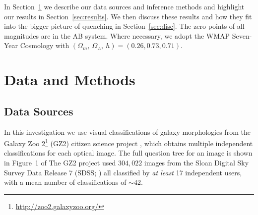 \documentclass[useAMS,usenatbib]{mn2e}
\begin{document}
In Section~\ref{sec:data} we describe our data sources and inference methods and highlight our results in Section~\ref{sec:results}. We then discuss these results and how they fit into the bigger picture of quenching in Section~\ref{sec:disc}. The zero points of all magnitudes are in the AB system. Where necessary, we adopt the WMAP Seven-Year Cosmology \citep{jarosik11} with $(\Omega_m , ~\Omega_\Lambda , ~h) = (0.26, 0.73, 0.71)$.

 
\section{Data and Methods}\label{sec:data}

\subsection{Data Sources}\label{sec:photo}

\begin{figure}
\label{fig:sfrmass}
\end{figure}

In this investigation we use visual classifications of galaxy morphologies from the Galaxy Zoo 2\footnote{\url{http://zoo2.galaxyzoo.org/}} (GZ2) citizen science project \citep{GZ2}, which obtains multiple independent classifications for each optical image. The full question tree for an image is shown in Figure~1 of \citeauthor{GZ2}  The GZ2 project used $304, 022$ images from the Sloan Digital Sky Survey Data Release 7 (SDSS; \citealt{york00, abazajian09}) all classified by \emph{at least} 17 independent users, with a mean number of classifications of $\sim42$.
\end{document}

